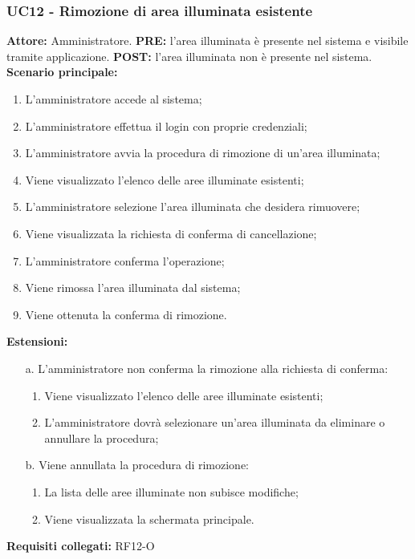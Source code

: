 \documentclass[a4paper, 12pt]{article}
\begin{document}
\subsubsection{UC12 - Rimozione di area illuminata esistente}
\textbf{Attore:} Amministratore.\newline
\textbf{PRE:} l'area illuminata è presente nel sistema e visibile tramite applicazione.\newline
\textbf{POST:} l'area illuminata non è presente nel sistema.\newline
\textbf{Scenario principale:}
\begin{enumerate}
    \item L'amministratore accede al sistema;
    \item L'amministratore effettua il login con proprie credenziali;
    \item L'amministratore avvia la procedura di rimozione di un'area illuminata;
    \item Viene visualizzato l'elenco delle aree illuminate esistenti;
    \item L'amministratore selezione l'area illuminata che desidera rimuovere;
    \item Viene visualizzata la richiesta di conferma di cancellazione;
    \item L'amministratore conferma l'operazione;
    \item Viene rimossa l'area illuminata dal sistema;
    \item Viene ottenuta la conferma di rimozione.
\end{enumerate}
\textbf{Estensioni:}
\begin{itemize}
    \item [a.] L'amministratore non conferma la rimozione alla richiesta di conferma:
          \begin{enumerate}
              \item Viene visualizzato l'elenco delle aree illuminate esistenti;
              \item L'amministratore dovrà selezionare un'area illuminata da eliminare o annullare la procedura;
          \end{enumerate}
    \item [b.] Viene annullata la procedura di rimozione:
          \begin{enumerate}
              \item La lista delle aree illuminate non subisce modifiche;
              \item Viene visualizzata la schermata principale.
          \end{enumerate}
\end{itemize}
\textbf{Requisiti collegati:} RF12-O\newline
\end{document}
